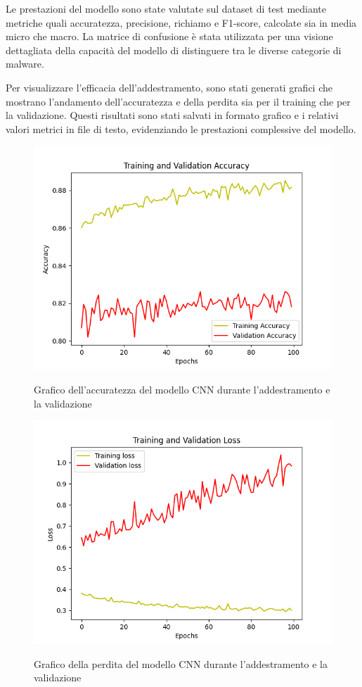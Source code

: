 Le prestazioni del modello sono state valutate sul dataset di test mediante metriche quali accuratezza, precisione, richiamo e F1-score, calcolate sia in media micro che macro. La matrice di confusione è stata utilizzata per una visione dettagliata della capacità del modello di distinguere tra le diverse categorie di malware.

Per visualizzare l'efficacia dell'addestramento, sono stati generati grafici che mostrano l'andamento dell'accuratezza e della perdita sia per il training che per la validazione. Questi risultati sono stati salvati in formato grafico e i relativi valori metrici in file di testo, evidenziando le prestazioni complessive del modello.

\newpage
\begin{figure}[ht]
    \centering
        \centering
        \includegraphics[width=0.7\linewidth]{images/cnn_accuracy.png}
        \label{fig:cnn_accuracy}
        \caption{Grafico dell'accuratezza del modello CNN durante l'addestramento e la validazione}
\end{figure}

\begin{figure}[ht]
    \centering
        \centering
        \includegraphics[width=0.7\linewidth]{images/cnn_loss.png}
        \label{fig:cnn_loss}
        \caption{Grafico della perdita del modello CNN durante l'addestramento e la validazione}
\end{figure}

